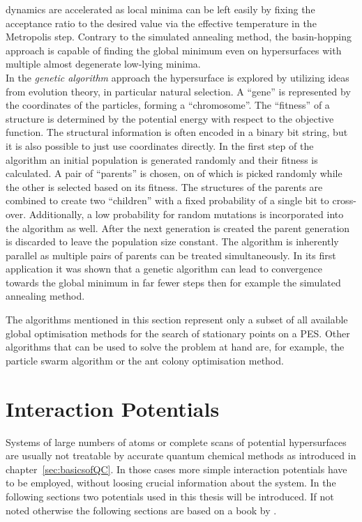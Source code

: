 dynamics are accelerated as local minima can be left easily by fixing the
acceptance ratio to the desired value via the effective temperature in the
Metropolis step. Contrary to the simulated annealing method, the basin-hopping
approach is capable of finding the global minimum even on hypersurfaces with
multiple almost degenerate low-lying minima.
%
\\\newline
In the \textit{genetic algorithm}
approach\autocite{Goldberg_GeneticAlgorithmsSearch_1989} the hypersurface is
explored by utilizing ideas from evolution theory, in particular natural
selection. A ``gene'' is represented by the coordinates of the particles,
forming a ``chromosome''. The ``fitness'' of a structure is determined by the
potential energy with respect to the objective function. The structural
information is often encoded in a binary bit string, but it is also possible to
just use coordinates directly. In the first step of the algorithm an initial
population is generated randomly and their fitness is calculated. A pair of
``parents'' is chosen, on of which is picked randomly while the other is
selected based on its fitness. The structures of the parents are combined to
create two ``children'' with a fixed probability of a single bit to cross-over.
Additionally, a low probability for random mutations is incorporated into the
algorithm as well. After the next generation is created the parent generation is
discarded to leave the population size constant. The algorithm is inherently
parallel as multiple pairs of parents can be treated simultaneously. In its
first application it was shown that a genetic algorithm can lead to convergence
towards the global minimum in far fewer steps then for example the simulated
annealing method.\autocite{Hartke_Globalgeometryoptimization_1993}

The algorithms mentioned in this section represent only a subset of all
available global optimisation methods for the search of stationary points on a
\ac{PES}. Other algorithms that can be used to solve the problem at hand are,
for example, the particle swarm algorithm or the ant colony optimisation method.


\chapter{Interaction Potentials}
\label{sec:energylandscapes}

Systems of large numbers of atoms or complete scans of potential hypersurfaces
are usually not treatable by accurate quantum chemical methods as introduced in
chapter~\ref{sec:basicsofQC}. In those cases more simple interaction potentials have to be
employed, without loosing crucial information about the system. In the following
sections two potentials used in this thesis will be introduced. If not noted
otherwise the following sections are based on a book by
\citeauthor{Hirschfelder_Moleculartheorygases_1964}.\autocite{Hirschfelder_Moleculartheorygases_1964} 

